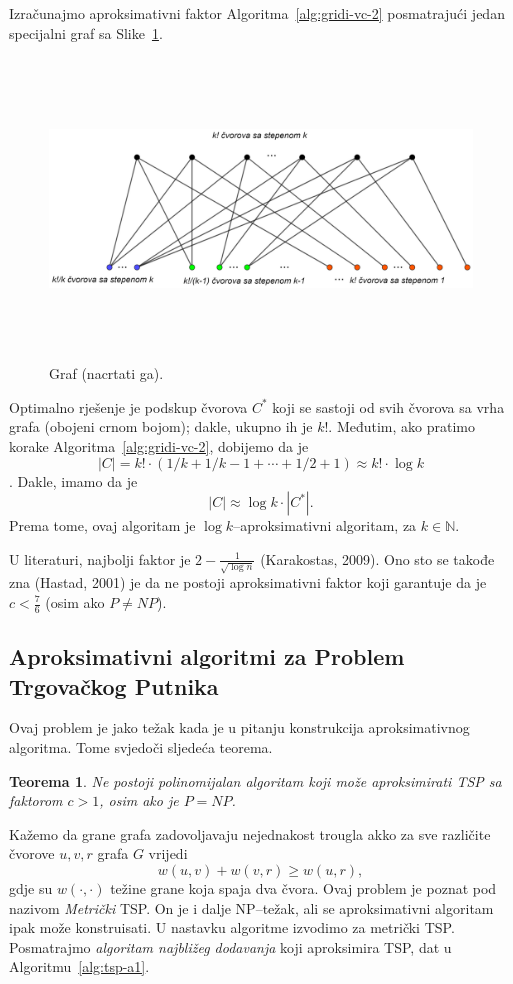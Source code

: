 \documentclass[a4paper, utf8, 11pt, colorlinks]{book}
\newtheorem{thm}{Teorema}
\begin{document}
  \noindent Izračunajmo aproksimativni faktor Algoritma~\ref{alg:gridi-vc-2} posmatrajući jedan specijalni graf sa Slike~\ref{vertex-cover}. 
  
  
  \begin{figure}
  	\centering
  	\includegraphics[width=120mm,height=80mm]{vc-2-example.eps}
  	\caption{Graf (nacrtati ga).} 
  	\label{vertex-cover}
 
  \end{figure}
  
  Optimalno rješenje je podskup čvorova $C^*$ koji se sastoji od svih čvorova sa vrha grafa (obojeni crnom bojom); dakle, ukupno ih je $k!$. Međutim, ako pratimo korake Algoritma~\ref{alg:gridi-vc-2}, dobijemo 
  da je $$|C| = k!\cdot( 1/k + 1/k-1 + \cdots + 1/2 + 1) \approx k! \cdot \log k$$. 
  Dakle, imamo da je
  $$   |C| \approx \log k \cdot |C^*|.$$ Prema tome, ovaj algoritam je $\log k$--aproksimativni algoritam, za $k \in \mathbb{N}$. 
  
  \noindent U literaturi, najbolji faktor je $2 - \frac{1}{\sqrt{\log n}}$ (Karakostas, 2009).
  Ono sto se takođe zna (Hastad, 2001) je da ne postoji aproksimativni faktor 
  koji garantuje da je $c < \frac{7}{6}$ (osim ako $P \neq NP$). 
  
  \subsection{Aproksimativni algoritmi za Problem Trgovačkog Putnika}
  
  Ovaj problem je jako težak kada je u pitanju konstrukcija aproksimativnog algoritma. Tome svjedoči sljedeća teorema.
 \begin{thm}
    Ne postoji polinomijalan algoritam koji može aproksimirati TSP sa  faktorom $c > 1$, osim ako je $P = NP$. 
\end{thm}
  Kažemo da grane grafa zadovoljavaju nejednakost trougla akko za sve različite čvorove $u,v, r$ grafa $G$ vrijedi
  $$ w(u,v) + w(v,r) \geq w(u,r),$$
  gdje su $w(\cdot, \cdot)$ težine grane koja spaja dva čvora. Ovaj problem je poznat 
  pod nazivom \emph{Metrički} TSP. On je i dalje NP--težak, ali se aproksimativni algoritam ipak može konstruisati.  U nastavku algoritme izvodimo za metrički  TSP. Posmatrajmo \emph{algoritam najbližeg dodavanja} koji aproksimira TSP, dat u Algoritmu~\ref{alg:tsp-a1}. 
  
\end{document}
